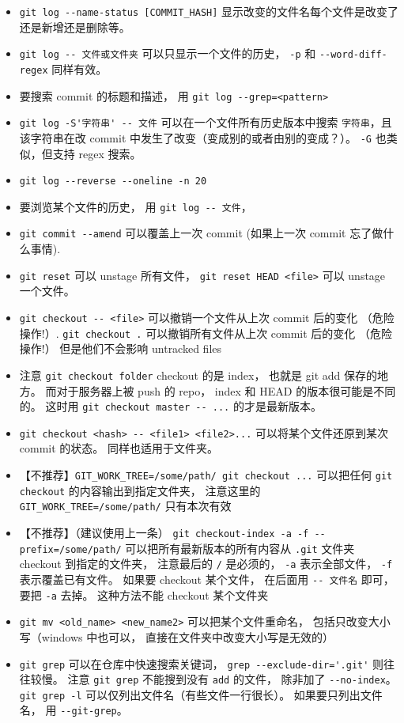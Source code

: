 \begin{itemize}
\item \verb|git log --name-status [COMMIT_HASH]| 显示改变的文件名每个文件是改变了还是新增还是删除等。
\item \verb|git log -- 文件或文件夹| 可以只显示一个文件的历史， \verb|-p| 和 \verb|--word-diff-regex| 同样有效。
\item 要搜索 commit 的标题和描述， 用 \verb|git log --grep=<pattern>|
\item \verb|git log -S'字符串' -- 文件| 可以在一个文件所有历史版本中搜索 \verb|字符串|，且该字符串在改 commit 中发生了改变（变成别的或者由别的变成？）。 \verb|-G| 也类似，但支持 regex 搜索。
\item \verb|git log --reverse --oneline -n 20|
\item 要浏览某个文件的历史， 用 \verb|git log -- 文件|， 
\item \verb|git commit --amend| 可以覆盖上一次 commit (如果上一次 commit 忘了做什么事情).
\item \verb|git reset| 可以 unstage 所有文件， \verb|git reset HEAD <file>| 可以 unstage 一个文件。
\item \verb|git checkout -- <file>| 可以撤销一个文件从上次 commit 后的变化 （危险操作!）. \verb|git checkout .| 可以撤销所有文件从上次 commit 后的变化 （危险操作!） 但是他们不会影响 untracked files
\item 注意 \verb|git checkout folder| checkout 的是 index， 也就是 git add 保存的地方。 而对于服务器上被 push 的 repo， index 和 HEAD 的版本很可能是不同的。 这时用 \verb|git checkout master -- ...| 的才是最新版本。
\item \verb|git checkout <hash> -- <file1> <file2>...| 可以将某个文件还原到某次 commit 的状态。 同样也适用于文件夹。
\item 【不推荐】\verb|GIT_WORK_TREE=/some/path/ git checkout ...| 可以把任何 \verb|git checkout| 的内容输出到指定文件夹， 注意这里的 \verb|GIT_WORK_TREE=/some/path/| 只有本次有效
\item 【不推荐】（建议使用上一条） \verb|git checkout-index -a -f --prefix=/some/path/| 可以把所有最新版本的所有内容从 \verb|.git| 文件夹 checkout 到指定的文件夹， 注意最后的 \verb|/| 是必须的， \verb|-a| 表示全部文件， \verb|-f| 表示覆盖已有文件。 如果要 checkout 某个文件， 在后面用 \verb|-- 文件名| 即可， 要把 \verb|-a| 去掉。 这种方法不能 checkout 某个文件夹
\item \verb|git mv <old_name> <new_name2>| 可以把某个文件重命名， 包括只改变大小写（windows 中也可以， 直接在文件夹中改变大小写是无效的）
\item \verb|git grep| 可以在仓库中快速搜索关键词， \verb|grep --exclude-dir='.git'| 则往往较慢。 注意 \verb|git grep| 不能搜到没有 \verb|add| 的文件， 除非加了 \verb|--no-index|。 \verb|git grep -l| 可以仅列出文件名（有些文件一行很长）。 如果要只列出文件名， 用 \verb`--git-grep`。

\end{itemize}

